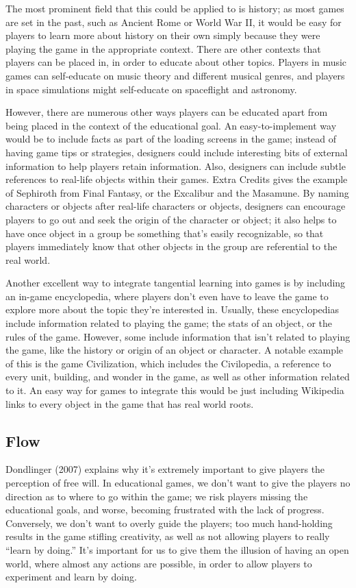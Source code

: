 \documentclass[12pt]{report}
\begin{document}
		The most prominent field that this could be applied to is history; as most games are set in the past, such as Ancient Rome or World War II, it would be easy for players to learn more about history on their own simply because they were playing the game in the appropriate context. There are other contexts that players can be placed in, in order to educate about other topics. Players in music games can self-educate on music theory and different musical genres, and players in space simulations might self-educate on spaceflight and astronomy. 
		
		However, there are numerous other ways players can be educated apart from being placed in the context of the educational goal. An easy-to-implement way would be to include facts as part of the loading screens in the game; instead of having game tips or strategies, designers could include interesting bits of external information to help players retain information. Also, designers can include subtle references to real-life objects within their games. Extra Credits gives the example of Sephiroth from Final Fantasy, or the Excalibur and the Masamune. By naming characters or objects after real-life characters or objects, designers can encourage players to go out and seek the origin of the character or object; it also helps to have once object in a group be something that's easily recognizable, so that players immediately know that other objects in the group are referential to the real world.
		
		Another excellent way to integrate tangential learning into games is by including an in-game encyclopedia, where players don't even have to leave the game to explore more about the topic they're interested in. Usually, these encyclopedias include information related to playing the game; the stats of an object, or the rules of the game. However, some include information that isn't related to playing the game, like the history or origin of an object or character. A notable example of this is the game Civilization, which includes the Civilopedia, a reference to every unit, building, and wonder in the game, as well as other information related to it. An easy way for games to integrate this would be just including Wikipedia links to every object in the game that has real world roots.
	
	\subsection{Flow}
		Dondlinger (2007) explains why it's extremely important to give players the perception of free will. In educational games, we don't want to give the players no direction as to where to go within the game; we risk players missing the educational goals, and worse, becoming frustrated with the lack of progress. Conversely, we don't want to overly guide the players; too much hand-holding results in the game stifling creativity, as well as not allowing players to really “learn by doing.” It's important for us to give them the illusion of having an open world, where almost any actions are possible, in order to allow players to experiment and learn by doing.
\end{document}
